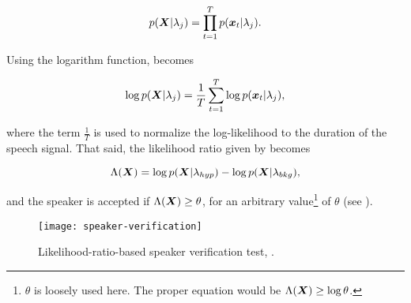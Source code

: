 \begin{equation}
    p(\dvec{X}|\lambda_j) = \prod_{t=1}^T p(\dvec{x}_t|\lambda_j).
    \label{eq:likelihood-prod}
\end{equation}

\noindent Using the logarithm function,  becomes

\begin{equation}
    \log p(\dvec{X}|\lambda_j) = \frac{1}{T} \sum_{t=1}^T \log p(\dvec{x}_t|\lambda_j),
    \label{eq:log-likelihood-sum}
\end{equation}

\noindent where the term $\frac{1}{T}$ is used to normalize the log-likelihood to the duration of the speech signal. That said, the likelihood ratio given by  becomes

\begin{equation}
    \Lambda(\dvec{X}) = \log p(\dvec{X}|\lambda_{hyp}) - \log p(\dvec{X}|\lambda_{bkg}),
    \label{eq:score_of_X}
\end{equation}

\noindent and the speaker is accepted if $\Lambda(\boldsymbol{X}) \geq \theta$, for an arbitrary value\footnote{$\theta$ is loosely used here. The proper equation would be $\Lambda(\boldsymbol{X}) \geq \log\theta$.} of $\theta$ (see ).

\begin{figure}[ht]
    \centering
    \texttt{[image: speaker-verification]}
    \caption{Likelihood-ratio-based speaker verification test, .}
    \label{fig:speaker-verification}
\end{figure}